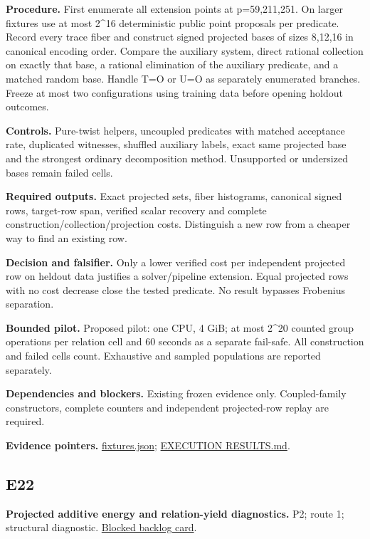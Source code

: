 \documentclass[
  10pt,
]{article}
\begin{document}
\textbf{Procedure.} First enumerate all extension points at
p=59,211,251. On larger fixtures use at most 2\^{}16 deterministic
public point proposals per predicate. Record every trace fiber and
construct signed projected bases of sizes 8,12,16 in canonical encoding
order. Compare the auxiliary system, direct rational collection on
exactly that base, a rational elimination of the auxiliary predicate,
and a matched random base. Handle T=O or U=O as separately enumerated
branches. Freeze at most two configurations using training data before
opening holdout outcomes.

\textbf{Controls.} Pure-twist helpers, uncoupled predicates with matched
acceptance rate, duplicated witnesses, shuffled auxiliary labels, exact
same projected base and the strongest ordinary decomposition method.
Unsupported or undersized bases remain failed cells.

\textbf{Required outputs.} Exact projected sets, fiber histograms,
canonical signed rows, target-row span, verified scalar recovery and
complete construction/collection/projection costs. Distinguish a new row
from a cheaper way to find an existing row.

\textbf{Decision and falsifier.} Only a lower verified cost per
independent projected row on heldout data justifies a solver/pipeline
extension. Equal projected rows with no cost decrease close the tested
predicate. No result bypasses Frobenius separation.

\textbf{Bounded pilot.} Proposed pilot: one CPU, 4 GiB; at most 2\^{}20
counted group operations per relation cell and 60 seconds as a separate
fail-safe. All construction and failed cells count. Exhaustive and
sampled populations are reported separately.

\textbf{Dependencies and blockers.} Existing frozen evidence only.
Coupled-family constructors, complete counters and independent
projected-row replay are required.

\textbf{Evidence pointers.}
\href{../../../research/twist_routes_1_3_20261021/execution-v1/fixtures.json}{fixtures.json};
\href{../../../research/twist_routes_1_3_20261021/reports/EXECUTION_RESULTS.md}{EXECUTION
RESULTS.md}.

\subsection{E22}\label{e22}

\textbf{Projected additive energy and relation-yield diagnostics.} P2;
route 1; structural diagnostic.
\href{../../../backlog/XP-20261022-twist-projected-energy/README.md}{Blocked
backlog card}.
\end{document}
